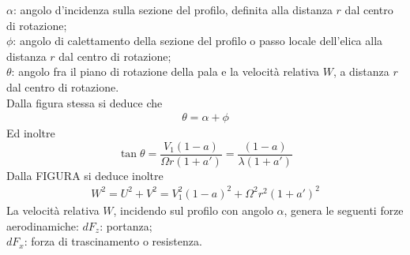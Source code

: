$\alpha$: angolo d'incidenza sulla sezione del profilo, definita alla distanza $r$ dal centro di rotazione;\\
$\phi$: angolo di calettamento della sezione del profilo o passo locale dell'elica alla distanza $r$ dal centro di rotazione;\\
$\theta$: angolo fra il piano di rotazione della pala e la velocità relativa $W$, a distanza $r$ dal centro di rotazione.\\[2mm]
Dalla figura stessa si deduce che 
\begin{align*}
\theta = \alpha + \phi
\end{align*}
Ed inoltre
\begin{equation}\label{eq:tantheta}
\tan \theta = \frac{V_1 \left(1-a \right)}{\Omega r \left(1 + a' \right)} = \frac{\left( 1-a \right)}{\lambda \left( 1 + a' \right)}
\end{equation}
Dalla FIGURA si deduce inoltre
\begin{align*}
W^2 = U^2 + V^2 = V_1^2 \left(1-a \right)^2 + \Omega^2 r^2 \left( 1+ a' \right)^2
\end{align*}
La velocità relativa $W$, incidendo sul profilo con angolo $\alpha$, genera le seguenti forze aerodinamiche:
$dF_z$: portanza;\\
$dF_x$: forza di trascinamento o resistenza.


